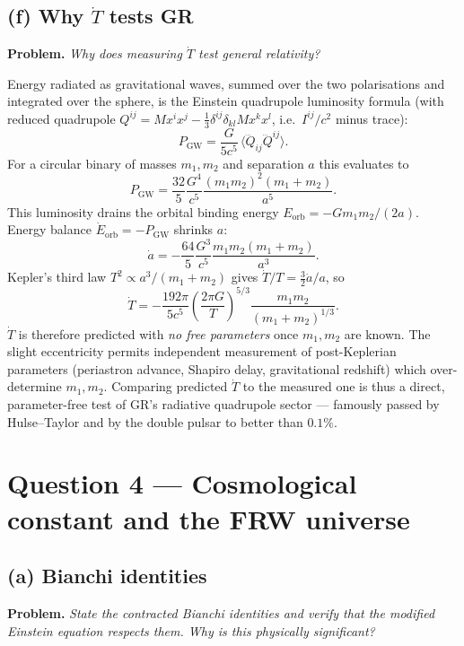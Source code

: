 \documentclass[11pt]{article}
\begin{document}
\subsection*{(f) Why $\dot T$ tests GR}

\textbf{Problem.} \emph{Why does measuring $\dot T$ test general relativity?}

Energy radiated as gravitational waves, summed over the two polarisations and integrated over the sphere, is the Einstein quadrupole luminosity formula (with reduced quadrupole $Q^{ij} = M x^i x^j -\tfrac13\delta^{ij}\delta_{kl}M x^k x^l$, i.e.\ $I^{ij}/c^2$ minus trace):
\[
P_{\mathrm{GW}} = \frac{G}{5 c^5}\,\langle\dddot Q_{ij}\dddot Q^{ij}\rangle.
\]
For a circular binary of masses $m_1,m_2$ and separation $a$ this evaluates to
\[
P_{\mathrm{GW}} = \frac{32}{5}\frac{G^4}{c^5}\frac{(m_1 m_2)^2(m_1+m_2)}{a^5}.
\]
This luminosity drains the orbital binding energy $E_{\mathrm{orb}} = -G m_1 m_2/(2a)$. Energy balance $\dot E_{\mathrm{orb}} = -P_{\mathrm{GW}}$ shrinks $a$:
\[
\dot a = -\frac{64}{5}\frac{G^3}{c^5}\frac{m_1 m_2(m_1+m_2)}{a^3}.
\]
Kepler's third law $T^2 \propto a^3/(m_1+m_2)$ gives $\dot T/T = \tfrac{3}{2}\dot a/a$, so
\[
\dot T = -\frac{192\pi}{5 c^5}\!\left(\frac{2\pi G}{T}\right)^{\!5/3}\!\frac{m_1 m_2}{(m_1+m_2)^{1/3}}.
\]
$\dot T$ is therefore predicted with \emph{no free parameters} once $m_1,m_2$ are known. The slight eccentricity permits independent measurement of post-Keplerian parameters (periastron advance, Shapiro delay, gravitational redshift) which over-determine $m_1, m_2$. Comparing predicted $\dot T$ to the measured one is thus a direct, parameter-free test of GR's radiative quadrupole sector --- famously passed by Hulse--Taylor and by the double pulsar to better than $0.1\%$.

\section*{Question 4 --- Cosmological constant and the FRW universe}

\subsection*{(a) Bianchi identities}

\textbf{Problem.} \emph{State the contracted Bianchi identities and verify that the modified Einstein equation respects them. Why is this physically significant?}
\end{document}
